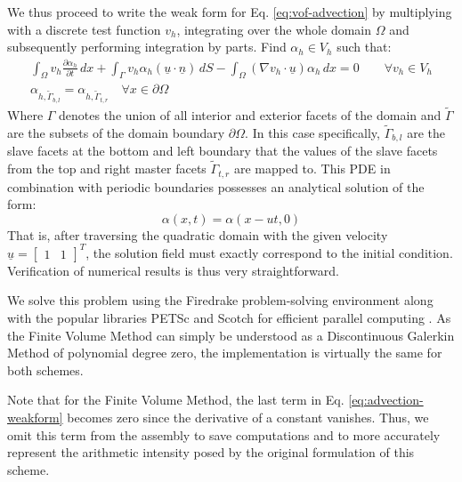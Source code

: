 \documentclass[asi,article,submit,moreauthors]{Definitions/mdpi}
\begin{document}
We thus proceed to write the weak form for Eq. \ref{eq:vof-advection} by multiplying with a discrete test function $v_h$, integrating over the whole domain $\Omega$ and subsequently performing integration by parts. Find $\alpha_h \in V_h$ such that:
\begin{align}
    \int_\Omega v_h \frac{\partial \alpha_h}{\partial t} \,dx + \int_\Gamma v_h \alpha_h (\underline{u}\cdot\underline{n}) \,dS - \int_\Omega (\nabla v_h \cdot \underline{u}) \alpha_h \,dx = 0     \qquad \forall v_h \in V_h
    \label{eq:advection-weakform} \\
    \alpha_{h,\tilde{\Gamma}_{b,l}} = \alpha_{h,\tilde{\Gamma}_{t,r}} \quad \forall x \in \partial\Omega
\end{align}
Where $\Gamma$ denotes the union of all interior and exterior facets of the domain and $\tilde{\Gamma}$ are the subsets of the domain boundary $\partial \Omega$. In this case specifically, $\tilde{\Gamma}_{b,l}$ are the slave facets at the bottom and left boundary that the values of the slave facets from the top and right master facets $\tilde{\Gamma}_{t,r}$ are mapped to.
This PDE in combination with periodic boundaries possesses an analytical solution of the form:
\begin{equation}
    \alpha(x,t) = \alpha(x-ut,0)
\end{equation}
That is, after traversing the quadratic domain with the given velocity $\underline{u} = \begin{bmatrix}1 & 1 \end{bmatrix}^T$, the solution field must exactly correspond to the initial condition.
Verification of numerical results is thus very straightforward.

We solve this problem using the Firedrake problem-solving environment along with the popular libraries PETSc and Scotch for efficient parallel computing \cite{FiredrakeUserManual,McRae2016,Homolya2016,Chaco95,PTSCOTCH,Rathgeber2016,dalcinParallelDistributedComputing2011,petsc-efficient,petsc-user-ref}.
As the Finite Volume Method can simply be understood as a Discontinuous Galerkin Method of polynomial degree zero, the implementation is virtually the same for both schemes.

Note that for the Finite Volume Method, the last term in Eq. \ref{eq:advection-weakform} becomes zero since the derivative of a constant vanishes. Thus, we omit this term from the assembly to save computations and to more accurately represent the arithmetic intensity posed by the original formulation of this scheme. 
\end{document}
